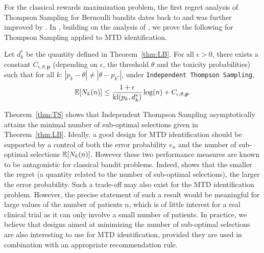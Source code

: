 For the classical rewards maximization problem, the first regret analysis of Thompson Sampling for Bernoulli bandits dates back to \cite{AGCOLT12} and was further improved by \cite{ALT12,AGAISTAT13}. %
In , building on the analysis of \cite{AGAISTAT13}, we prove the following for Thompson Sampling applied to MTD identification. 

\begin{theorem}\label{thm:TS}  Let $d_k^*$ be the quantity defined in Theorem~\ref{thm:LB}. For all $\epsilon >0$, there exists a constant $C_{\epsilon,\theta,\bm p}$ (depending on $\epsilon$, the threshold $\theta$ and the toxicity probabilities) such that for all $k$:  $|p_k - \theta| \neq |\theta - p_{k^*}|$, under \texttt{Independent Thompson Sampling},\[
\mathbb{E}[N_{k}(n)]  \leq \frac{1 + \epsilon}{\mathrm{kl}(p_k,d_k^*)} \log(n) + C_{\epsilon,\theta,\bm p}.\]
\end{theorem}

Theorem~\ref{thm:TS} shows that Independent Thompson Sampling asymptotically attains the minimal number of sub-optimal selections given in Theorem~\ref{thm:LB}. Ideally, a good design for MTD identification should be supported by a control of both the error probability $e_n$ and the number of sub-optimal selections $\mathbb{E}[N_k(n)]$. However these two performance measures are known to be antagonistic for classical bandit problems. Indeed, \cite{Bubeckal11} shows that the smaller the regret (a quantity related to the number of sub-optimal selections), the larger the error probability. Such a trade-off may also exist for the MTD identification problem. However, the precise statement of such a result would be meaningful for large values of the number of patients $n$, which is of little interest for a real clinical trial as it can only involve a small number of patients. In practice, we believe that designs aimed at minimizing the number of sub-optimal selections are also interesting to use for MTD identification, provided they are used in combination with an appropriate recommendation rule. 

